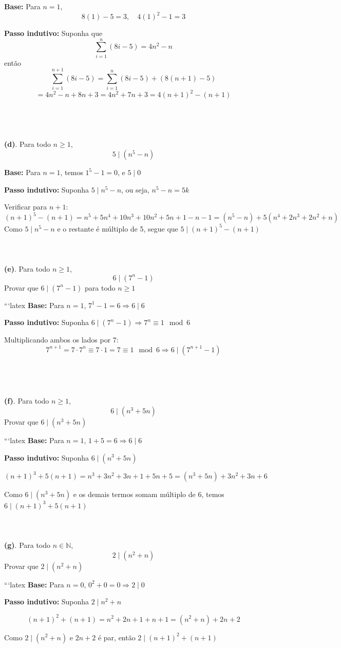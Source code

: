 \documentclass{article}
\begin{document}
\textbf{Base:} Para \( n = 1 \),
\[
8(1) - 5 = 3, \quad 4(1)^2 - 1 = 3
\]

\textbf{Passo indutivo:} Suponha que
\[
\sum_{i=1}^n (8i - 5) = 4n^2 - n
\]
então
\[
\sum_{i=1}^{n+1} (8i - 5) = \sum_{i=1}^n (8i - 5) + (8(n+1) - 5)
\]
\[
= 4n^2 - n + 8n + 3 = 4n^2 + 7n + 3 = 4(n+1)^2 - (n+1)
\]
\\\\
\\\\
\textbf{(d)}. Para todo \( n \geq 1 \),
\[
5 \mid (n^5 - n)
\]

\textbf{Base:} Para \( n = 1 \), temos \( 1^5 - 1 = 0 \), e \( 5 \mid 0 \)

\textbf{Passo indutivo:} Suponha \( 5 \mid n^5 - n \), ou seja, \( n^5 - n = 5k \)

Verificar para \( n+1 \):
\[
(n+1)^5 - (n+1) = n^5 + 5n^4 + 10n^3 + 10n^2 + 5n + 1 - n - 1 = (n^5 - n) + 5(n^4 + 2n^3 + 2n^2 + n)
\]
Como \( 5 \mid n^5 - n \) e o restante é múltiplo de 5, segue que \( 5 \mid (n+1)^5 - (n+1) \)
\\\\
\\\\
\textbf{(e)}. Para todo \( n \geq 1 \),
\[
6 \mid (7^n - 1)
\]
Provar que \( 6 \mid (7^n - 1) \) para todo \( n \geq 1 \)

```latex
\textbf{Base:} Para \( n = 1 \), \( 7^1 - 1 = 6 \Rightarrow 6 \mid 6 \)

\textbf{Passo indutivo:} Suponha \( 6 \mid (7^n - 1) \Rightarrow 7^n \equiv 1 \mod 6 \)

Multiplicando ambos os lados por 7:
\[
7^{n+1} = 7 \cdot 7^n \equiv 7 \cdot 1 = 7 \equiv 1 \mod 6
\Rightarrow 6 \mid (7^{n+1} - 1)
\]
\\\\
\\\\
\textbf{(f)}. Para todo \( n \geq 1 \),
\[
6 \mid (n^3 + 5n)
\]
Provar que \( 6 \mid (n^3 + 5n) \)

```latex
\textbf{Base:} Para \( n = 1 \), \( 1 + 5 = 6 \Rightarrow 6 \mid 6 \)

\textbf{Passo indutivo:} Suponha \( 6 \mid (n^3 + 5n) \)

\[
(n+1)^3 + 5(n+1) = n^3 + 3n^2 + 3n + 1 + 5n + 5 = (n^3 + 5n) + 3n^2 + 3n + 6
\]

Como \( 6 \mid (n^3 + 5n) \) e os demais termos somam múltiplo de 6, temos \( 6 \mid (n+1)^3 + 5(n+1) \)
\\\\
\\\\
\textbf{(g)}. Para todo \( n \in \mathbb{N} \),
\[
2 \mid (n^2 + n)
\]
Provar que \( 2 \mid (n^2 + n) \)

```latex
\textbf{Base:} Para \( n = 0 \), \( 0^2 + 0 = 0 \Rightarrow 2 \mid 0 \)

\textbf{Passo indutivo:} Suponha \( 2 \mid n^2 + n \)

\[
(n+1)^2 + (n+1) = n^2 + 2n + 1 + n + 1 = (n^2 + n) + 2n + 2
\]

Como \( 2 \mid (n^2 + n) \) e \( 2n + 2 \) é par, então \( 2 \mid (n+1)^2 + (n+1) \)
\end{document}
